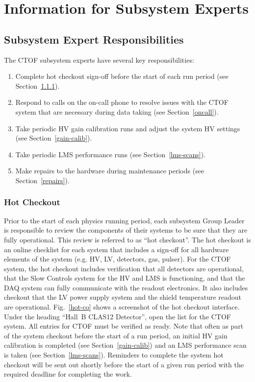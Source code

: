 \documentclass[12pt]{article}
\begin{document}
\vfil
\eject

\section{Information for Subsystem Experts}

\subsection{Subsystem Expert Responsibilities}

The CTOF subsystem experts have several key responsibilities:

\begin{enumerate}
\item Complete hot checkout sign-off before the start of each run period (see Section~\ref{checkout}).
\item Respond to calls on the on-call phone to resolve issues with the CTOF system that are necessary 
during data taking (see Section~\ref{oncall}).
\item Take periodic HV gain calibration runs and adjust the system HV settings (see 
Section~\ref{gain-calib}).
\item Take periodic LMS performance runs (see Section~\ref{lms-scans}).
\item Make repairs to the hardware during maintenance periods (see Section~\ref{repairs}).
\end{enumerate}

\subsubsection{Hot Checkout}
\label{checkout}

Prior to the start of each physics running period, each subsystem Group Leader is responsible to
review the components of their systems to be sure that they are fully operational. This review is
referred to as ``hot checkout''. The hot checkout is an online checklist for each system that
includes a sign-off for all hardware elements of the system (e.g. HV, LV, detectors, gas, pulser).
For the CTOF system, the hot checkout includes verification that all detectors are operational, that
the Slow Controls system for the HV and LMS is functioning, and that the DAQ system can fully
communicate with the readout electronics. It also includes checkout that the LV power supply system 
and the shield temperature readout are operational. Fig.~\ref{hot-co} shows a screenshot of the hot 
checkout interface. Under the heading ``Hall~B CLAS12 Detector'', open the list for the CTOF system. 
All entries for CTOF must be verified as ready. Note that often as part of the system checkout before
the start of a run period, an initial HV gain calibration is completed (see Section~\ref{gain-calib}) 
and an LMS performance scan is taken (see Section~\ref{lms-scans}). Reminders to complete the system 
hot checkout will be sent out shortly before the start of a given run period with the required 
deadline for completing the work.
\end{document}
